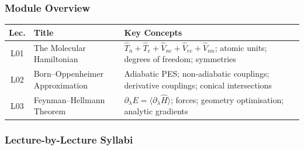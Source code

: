\documentclass[11pt,a4paper]{article}
\begin{document}
\subsubsection*{Module Overview}
\begin{center}
\begin{tabular}{@{}clp{8cm}@{}}
\toprule
\textbf{Lec.} & \textbf{Title} & \textbf{Key Concepts}\\
\midrule
L01 & The Molecular Hamiltonian & $\hat{T}_n+\hat{T}_e+\hat{V}_{ne}+\hat{V}_{ee}+\hat{V}_{nn}$; atomic units; degrees of freedom; symmetries\\
L02 & Born--Oppenheimer Approximation & Adiabatic PES; non-adiabatic couplings; derivative couplings; conical intersections\\
L03 & Feynman--Hellmann Theorem & $\partial_\lambda E=\langle\partial_\lambda\hat{H}\rangle$; forces; geometry optimisation; analytic gradients\\
\bottomrule
\end{tabular}
\end{center}

\subsubsection*{Lecture-by-Lecture Syllabi}
\end{document}
